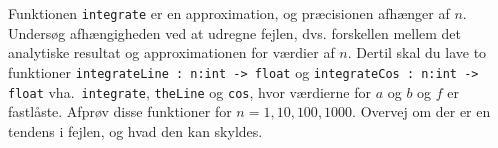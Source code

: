 Funktionen \lstinline{integrate} er en approximation, og præcisionen afhænger af $n$. Undersøg afhængigheden ved at udregne fejlen, dvs. forskellen mellem det analytiske resultat og approximationen for værdier af $n$. Dertil skal du lave to funktioner \lstinline{integrateLine : n:int -> float} og \lstinline{integrateCos : n:int -> float} vha.\ \lstinline{integrate}, \lstinline{theLine} og \lstinline{cos}, hvor værdierne for $a$ og $b$ og $f$ er fastlåste. Afprøv disse funktioner for $n = 1, 10, 100, 1000$. Overvej om der er en tendens i fejlen, og hvad den kan skyldes.